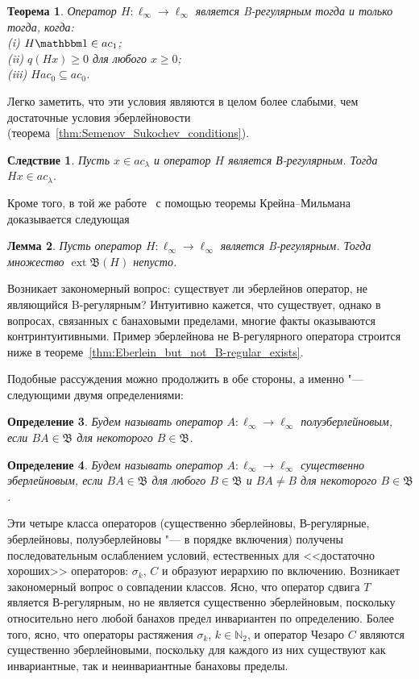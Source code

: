 \documentclass[a4paper,14pt]{article} %
\DeclareMathOperator{\ext}{ext}
\newcommand{\N}{\ensuremath{\mathbb{N}}}
\newcommand{\B}{\ensuremath{\mathfrak{B}}}
\newcommand{\one}{\ensuremath{\mathbbm 1}}
\theoremstyle{plain}
\newtheorem{lemma}{Лемма}[section]
\newtheorem{theorem}[lemma]{Теорема}
\newtheorem{corollary}{Следствие}[lemma]
\newtheorem{definition}[lemma]{Определение}
\begin{document}
\begin{theorem}
	\label{thm:crit_B_regularity}
	Оператор $H:\ell_\infty \to \ell_\infty$ является B-регулярным тогда и только тогда, когда:
	\\(i) $H\one \in ac_1$;
	\\(ii) $q(Hx)\geq 0$ для любого $x\geq 0$;
	\\(iii) $H ac_0 \subseteq ac_0$.
\end{theorem}
Легко заметить, что эти условия являются в целом более слабыми, чем достаточные условия эберлейновости
(теорема~\ref{thm:Semenov_Sukochev_conditions}).

\begin{corollary}
	Пусть $x\in ac_\lambda$ и оператор $H$ является В-регулярным.
	Тогда $Hx \in ac_\lambda$.
\end{corollary}

Кроме того, в той же работе~\cite{alekhno2018invariant}
с помощью теоремы Крейна--Мильмана~\cite[Theorem  9.14]{aliprantis2006positive}
доказывается следующая
\begin{lemma}
	Пусть оператор $H:\ell_\infty\to\ell_\infty$ является B-регулярным.
	Тогда множество $\ext\B(H)$ непусто.
\end{lemma}

Возникает закономерный вопрос: существует ли эберлейнов оператор, не являющийся B-регулярным?
Интуитивно кажется, что существует, однако в вопросах, связанных с банаховыми пределами,
многие факты оказываются контринтуитивными.
Пример эберлейнова не В-регулярного оператора строится ниже
в теореме~\ref{thm:Eberlein_but_not_B-regular_exists}.

Подобные рассуждения можно продолжить в обе стороны, а именно "--- следующими двумя определениями:

\begin{definition}
	Будем называть оператор $A:\ell_\infty \to \ell_\infty$ \emph{полуэберлейновым}, если $BA\in\mathfrak B$ для некоторого $B\in\mathfrak B$.
\end{definition}

\begin{definition}
	Будем называть оператор $A:\ell_\infty \to \ell_\infty$ \emph{существенно эберлейновым}, если $BA\in\mathfrak B$ для любого $B\in\mathfrak B$ и $BA\ne B$ для некоторого $B\in\mathfrak B$.
\end{definition}

Эти четыре класса операторов (существенно эберлейновы, В-регулярные, эберлейновы, полуэберлейновы "--- в порядке включения)
получены последовательным ослаблением условий, естественных для <<достаточно хороших>> операторов:
$\sigma_k$, $C$
и образуют иерархию по включению.
Возникает закономерный вопрос о совпадении классов.
Ясно, что оператор сдвига $T$ является В-регулярным, но не является существенно эберлейновым, поскольку относительно него любой банахов предел инвариантен по определению.
Более того, ясно, что операторы растяжения $\sigma_k$, $k\in\N_2$, и оператор Чезаро $C$ являются существенно эберлейновыми,
поскольку для каждого из них существуют как инвариантные, так и неинвариантные банаховы пределы.
\end{document}
